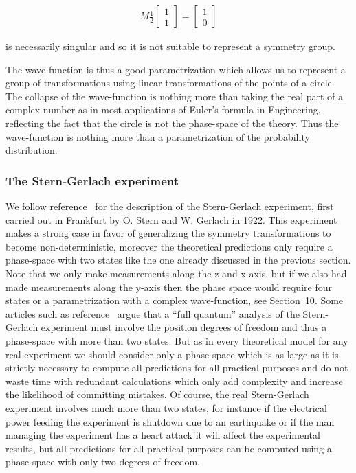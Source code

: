 \documentclass[11pt]{book}
\begin{document}
\begin{equation}\begin{aligned}
M\frac{1}{2}\left[\begin{smallmatrix} 1 \\ 1 \end{smallmatrix}\right]=\left[\begin{smallmatrix} 1\\ 0 \end{smallmatrix}\right]\end{aligned}\end{equation}

is necessarily singular and so it is not suitable to represent a
symmetry group.

The wave-function is thus a good parametrization which allows us to
represent a group of transformations using linear transformations of the
points of a circle. The collapse of the wave-function is nothing more
than taking the real part of a complex number as in most applications of
Euler's formula in Engineering, reflecting the fact that the circle is
not the phase-space of the theory. Thus the wave-function is nothing
more than a parametrization of the probability distribution.

\hypertarget{sec:sg}{%
\subsubsection{The Stern-Gerlach experiment}\label{sec:sg}}

We follow reference~\cite{sakurai_modern_2017} for the description of the Stern-Gerlach
experiment, first carried out in Frankfurt by O. Stern and W. Gerlach in
1922. This experiment makes a strong case in favor of generalizing the
symmetry transformations to become non-deterministic, moreover the
theoretical predictions only require a phase-space with two states like
the one already discussed in the previous section. Note that we only
make measurements along the z and x-axis, but if we also had made
measurements along the y-axis then the phase space would require four
states or a parametrization with a complex wave-function, see
Section~\protect\hyperlink{sec:complex}{10}. Some articles such as
reference~\cite{Rodrux131ux301guez2017full} argue that a ``full quantum'' analysis of the
Stern-Gerlach experiment must involve the position degrees of freedom
and thus a phase-space with more than two states. But as in every
theoretical model for any real experiment we should consider only a
phase-space which is as large as it is strictly necessary to compute all
predictions for all practical purposes and do not waste time with
redundant calculations which only add complexity and increase the
likelihood of committing mistakes. Of course, the real Stern-Gerlach
experiment involves much more than two states, for instance if the
electrical power feeding the experiment is shutdown due to an earthquake
or if the man managing the experiment has a heart attack it will affect
the experimental results, but all predictions for all practical purposes
can be computed using a phase-space with only two degrees of freedom.
\end{document}
